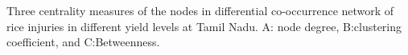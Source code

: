 Three centrality measures of the nodes in differential co-occurrence network of rice injuries in different yield levels at Tamil Nadu. A: node degree, B:clustering coefficient, and C:Betweenness.
\label{fig:nodepropdifyieldTM}
